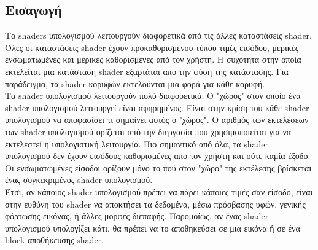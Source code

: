 \subsection{Εισαγωγή}
Τα shaders υπολογισμού λειτουργούν διαφορετικά από τις άλλες καταστάσεις shader. Όλες οι καταστάσεις shader έχουν προκαθορισμένου τύπου τιμές εισόδου, μερικές ενσωματωμένες και μερικές καθορισμένες από τον χρήστη. Η συχότητα στην οποία εκτελείται μια κατάσταση shader εξαρτάται από την φύση της κατάστασης. Για παράδειγμα, τα shader κορυφών εκτελούνται μια φορά για κάθε κορυφή. \\
Τα shader υπολογισμού λειτουργούν πολύ διαφορετικά. Ο "χώρος" στον οποίο ένα shader υπολογισμού λειτουργεί είναι αφηρημένος. Είναι στην κρίση του κάθε shader υπολογισμού να αποφασίσει τι σημαίνει αυτός ο "χώρος". Ο αριθμός των εκτελέσεων των shader υπολογισμού ορίζεται από την διεργασία που χρησιμοποιείται για να εκτελεστεί η υπολογιστική λειτουργία. Πιο σημαντικό από όλα, τα shader υπολογισμού δεν έχουν εισόδους καθορισμένες απο τον χρήστη και ούτε καμία έξοδο. Οι ενσωματωμένες είσοδοι ορίζουν μόνο το πού στον "χώρο" της εκτέλεσης βρίσκεται ένας συγκεκριμένος shader υπολογισμού.\\
Έτσι, αν κάποιος shader υπολογισμού πρέπει να πάρει κάποιες τιμές σαν είσοδο, είναι στην ευθύνη του shader να αποκτήσει τα δεδομένα, μέσω πρόσβασης υφών, γενικής φόρτωσης εικόνας, ή άλλες μορφές διεπαφής. Παρομοίως, αν ένας shader υπολογισμού υπολογίζει κάτι, θα πρέπει να το αποθηκεύσει σε μια εικόνα ή σε ένα block αποθήκευσης shader.
